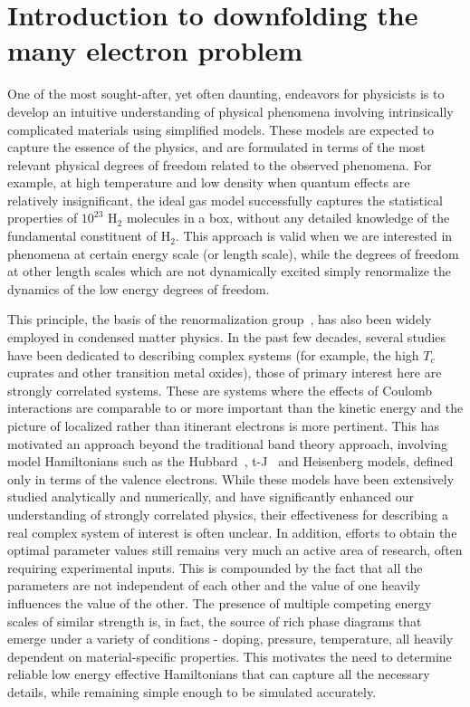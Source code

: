 \documentclass[prl,12pt,onecolumn,nofootinbib,notitlepage,english,superscriptaddress]{revtex4-1}
\begin{document}
\section{Introduction to downfolding the many electron problem}

One of the most sought-after, yet often daunting, endeavors for physicists is to develop 
an intuitive understanding of physical phenomena involving intrinsically complicated materials 
using simplified models. These models are expected to capture the essence of the physics, and are formulated in terms 
of the most relevant physical degrees of freedom related to the observed phenomena. 
For example, at high temperature and low density when quantum effects are relatively insignificant, the ideal gas model 
successfully captures the statistical properties of $10^{23}$ H$_{2}$ molecules in a box, 
without any detailed knowledge of the fundamental constituent of H$_{2}$. This approach is valid when we are interested in 
phenomena at certain energy scale (or length scale), while the degrees of freedom at other length scales which are not 
dynamically excited simply renormalize the dynamics of the low energy degrees of freedom. 

This principle, the basis of the renormalization group~\cite{Wilson}, 
has also been widely employed in condensed matter physics. In the past few decades, several studies 
have been dedicated to describing complex systems (for example, the high $T_c$ cuprates and other transition metal oxides), those of 
primary interest here are strongly correlated systems. These are systems where the effects of Coulomb 
interactions are comparable to or more important than the kinetic energy and the picture of 
localized rather than itinerant electrons is more pertinent. This has motivated an approach beyond the 
traditional band theory approach, involving model Hamiltonians such as the Hubbard~\cite{Hubbard}, t-J~\cite{tJSpalek} 
and Heisenberg models, defined only in terms of the valence electrons. 
While these models have been extensively studied analytically and numerically, and have significantly 
enhanced our understanding of strongly correlated physics, their effectiveness 
for describing a real complex system of interest is often unclear. In addition, efforts to obtain the 
optimal parameter values still remains very much an active area of research, often requiring experimental inputs. 
This is compounded by the fact that all the parameters are not independent of each other and 
the value of one heavily influences the value of the other. The presence of multiple competing energy scales of similar strength 
is, in fact, the source of rich phase diagrams that 
emerge under a variety of conditions - doping, pressure, 
temperature, all heavily dependent on material-specific properties. This motivates 
the need to determine reliable low energy effective Hamiltonians that can capture all the necessary details, while 
remaining simple enough to be simulated accurately.  
\end{document}
